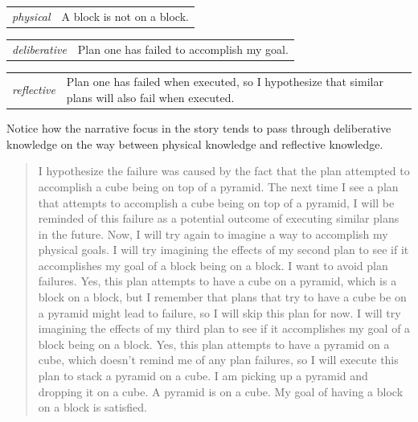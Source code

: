 \begin{tabular}{p{2cm}p{8cm}}
  {\emph{physical}} & A block is not on a block. \\
\end{tabular}

\begin{tabular}{p{2cm}p{8cm}}
  {\emph{deliberative}} & Plan one has failed to accomplish my
  goal. \\
\end{tabular}

\begin{tabular}{p{2cm}p{8cm}}
  {\emph{reflective}} & Plan one has failed when executed, so I
  hypothesize that similar plans will also fail when executed. \\
\end{tabular}

Notice how the narrative focus in the story tends to pass through
deliberative knowledge on the way between physical knowledge and
reflective knowledge.

\begin{quote}
  I hypothesize the failure was caused by the fact that the plan
  attempted to accomplish a cube being on top of a pyramid.  The next
  time I see a plan that attempts to accomplish a cube being on top of
  a pyramid, I will be reminded of this failure as a potential outcome
  of executing similar plans in the future.  Now, I will try again to
  imagine a way to accomplish my physical goals.  I will try imagining
  the effects of my second plan to see if it accomplishes my goal of a
  block being on a block.  I want to avoid plan failures.  Yes, this
  plan attempts to have a cube on a pyramid, which is a block on a
  block, but I remember that plans that try to have a cube be on a
  pyramid might lead to failure, so I will skip this plan for now.  I
  will try imagining the effects of my third plan to see if it
  accomplishes my goal of a block being on a block.  Yes, this plan
  attempts to have a pyramid on a cube, which doesn't remind me of any
  plan failures, so I will execute this plan to stack a pyramid on a
  cube.  I am picking up a pyramid and dropping it on a cube.  A
  pyramid is on a cube.  My goal of having a block on a block is
  satisfied.
\end{quote}


